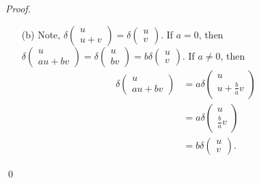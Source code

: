 \documentclass[12pt]{article}
\newenvironment{sol}
    {\emph{Proof.}
    }
    {
    \qed
    }
\begin{document}
\begin{sol}
\begin{itemize}
    \item[(b)] Note, $\delta \begin{pmatrix}
    u \\ u + v
    \end{pmatrix} = \delta \begin{pmatrix}
    u \\ v
    \end{pmatrix}$. If $a = 0$, then $\delta \begin{pmatrix}
    u \\ au + bv
    \end{pmatrix} = \delta \begin{pmatrix}
    u \\ bv
    \end{pmatrix} = b \delta \begin{pmatrix}
    u \\ v
    \end{pmatrix}$. If $a \neq 0$, then \begin{align*}
        \delta \begin{pmatrix}
        u \\ au + bv
        \end{pmatrix} &= a \delta \begin{pmatrix}
        u \\ u + \frac{b}{a}v
        \end{pmatrix} \\
        &= a \delta \begin{pmatrix}
        u \\ \frac{b}{a}v
        \end{pmatrix} \\
        &= b \delta \begin{pmatrix}
        u \\ v
        \end{pmatrix}.
    \end{align*}
    

\end{itemize}
\end{sol}
\end{document}
